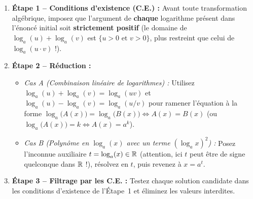 \begin{astuce}
\begin{enumerate}
    \item \textbf{Étape 1 -- Conditions d'existence (C.E.) :} Avant toute transformation algébrique, imposez que l'argument de \textbf{chaque} logarithme présent dans l'énoncé initial soit \textbf{strictement positif} (le domaine de $\log_a(u) + \log_a(v)$ est $\{u > 0 \text{ et } v > 0\}$, plus restreint que celui de $\log_a(u\cdot v)$ !).
    \item \textbf{Étape 2 -- Réduction :}
    \begin{itemize}
        \item \emph{Cas A (Combinaison linéaire de logarithmes) :} Utilisez $\log_a(u) + \log_a(v) = \log_a(uv)$ et $\log_a(u) - \log_a(v) = \log_a(u/v)$ pour ramener l'équation à la forme $\log_a\bigl(A(x)\bigr) = \log_a\bigl(B(x)\bigr) \iff A(x) = B(x)$ (ou $\log_a\bigl(A(x)\bigr) = k \iff A(x) = a^k$).
        \item \emph{Cas B (Polynôme en $\log_a(x)$ avec un terme $(\log_a x)^2$) :} Posez l'inconnue auxiliaire $t = \log_a(x) \in \mathbb{R}$ (attention, ici $t$ peut être de signe quelconque dans $\mathbb{R}$ !), résolvez en $t$, puis revenez à $x = a^t$.
    \end{itemize}
    \item \textbf{Étape 3 -- Filtrage par les C.E. :} Testez chaque solution candidate dans les conditions d'existence de l'Étape~1 et éliminez les valeurs interdites.
\end{enumerate}
\end{astuce}

